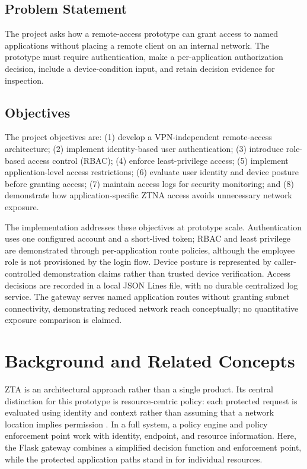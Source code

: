 \documentclass[conference]{IEEEtran}
\begin{document}
\subsection{Problem Statement}
The project asks how a remote-access prototype can grant access to named applications without placing a remote client on an internal network. The prototype must require authentication, make a per-application authorization decision, include a device-condition input, and retain decision evidence for inspection.

\subsection{Objectives}
The project objectives are: (1) develop a VPN-independent remote-access architecture; (2) implement identity-based user authentication; (3) introduce role-based access control (RBAC); (4) enforce least-privilege access; (5) implement application-level access restrictions; (6) evaluate user identity and device posture before granting access; (7) maintain access logs for security monitoring; and (8) demonstrate how application-specific ZTNA access avoids unnecessary network exposure.

The implementation addresses these objectives at prototype scale. Authentication uses one configured account and a short-lived token; RBAC and least privilege are demonstrated through per-application route policies, although the employee role is not provisioned by the login flow. Device posture is represented by caller-controlled demonstration claims rather than trusted device verification. Access decisions are recorded in a local JSON Lines file, with no durable centralized log service. The gateway serves named application routes without granting subnet connectivity, demonstrating reduced network reach conceptually; no quantitative exposure comparison is claimed.

\section{Background and Related Concepts}
ZTA is an architectural approach rather than a single product. Its central distinction for this prototype is resource-centric policy: each protected request is evaluated using identity and context rather than assuming that a network location implies permission \cite{nist207}. In a full system, a policy engine and policy enforcement point work with identity, endpoint, and resource information. Here, the Flask gateway combines a simplified decision function and enforcement point, while the protected application paths stand in for individual resources.
\end{document}
